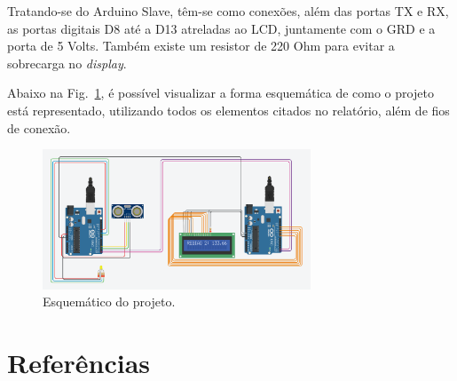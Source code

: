 \documentclass[conference]{IEEEtran}
\begin{document}
    Tratando-se do Arduino Slave, têm-se como conexões, além das portas TX e RX, as portas digitais D8 até
a D13 atreladas ao LCD, juntamente com o GRD e a porta de 5 Volts. Também existe um resistor de 220 Ohm para
evitar a sobrecarga no \emph{display}.

Abaixo na Fig.~\ref{fig}, é possível visualizar a forma esquemática de como o projeto está 
representado, utilizando todos os elementos citados no relatório, além de fios de conexão.

\begin{figure}[htbp]
    \centerline{
        \includegraphics[width=8cm]{images/esquematico.png}
        }
    \caption{Esquemático do projeto.}
    \label{fig}
    \end{figure}

\section{Referências}
\end{document}
